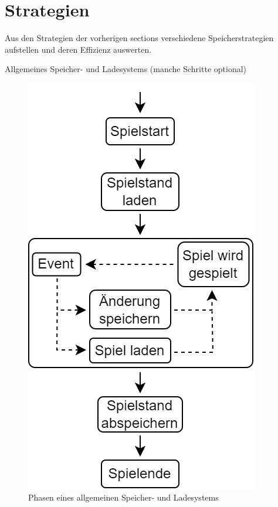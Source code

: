 \section{Strategien}
Aus den Strategien der vorherigen sections verschiedene Speicherstrategien aufstellen und deren Effizienz auswerten.

Allgemeines Speicher- und Ladesystems (manche Schritte optional)
\begin{figure}[H]
    \centering
    \includegraphics[scale=0.5]{images/Speichersystem.png}
    \caption{Phasen eines allgemeinen Speicher- und Ladesystems}
    \label{fig:speicherphasen}
\end{figure}

